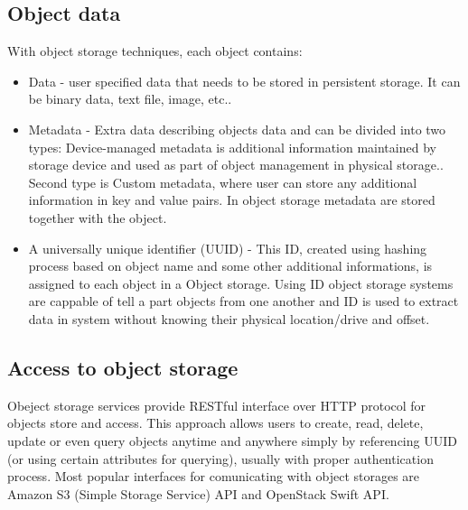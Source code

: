     \subsection{Object data}
    With object storage techniques, each object contains\cite{ibmObjectStorage}:
    \begin{itemize}
      \item{Data - user specified data that needs to be stored in persistent storage. It can be binary data, text file, image, etc..}
      \item{Metadata - Extra data describing objects data and can be divided into two types: Device-managed metadata is additional information maintained by storage device and used as part of object management in physical storage.\cite{objectBasedStorage}. Second type is Custom metadata, where user can store any additional information in key and value pairs. In object storage metadata are stored together with the object.}
      \item{A universally unique identifier (UUID) - This ID, created using hashing process based on object name and some other additional informations, is assigned to each object in a Object storage. Using ID object storage systems are cappable of tell a part objects from one another and ID is used to extract data in system without knowing their physical location/drive and offset.}
    \end{itemize}

    \subsection{Access to object storage}
    Obeject storage services provide RESTful interface \cite{cloudObjectStorage} over HTTP protocol for objects store and access. This approach allows users to create, read, delete, update or even query objects anytime and anywhere simply by referencing UUID (or using certain attributes for querying), usually with proper authentication process. Most popular interfaces for comunicating with object storages are Amazon S3 (Simple Storage Service) API and OpenStack Swift API.

